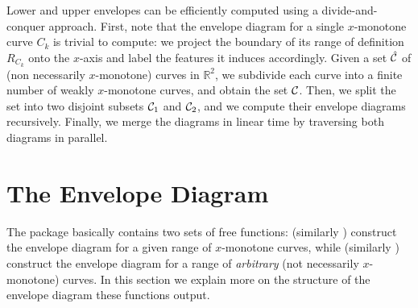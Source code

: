 Lower and upper envelopes can be efficiently computed using a
divide-and-conquer approach. First, note that the envelope diagram for
a single $x$-monotone curve $C_k$ is trivial to compute: we project
the boundary of its range of definition $R_{C_k}$ onto the $x$-axis
and label the features it induces accordingly. Given a set
$\hat{{\cal C}}$ of (non necessarily $x$-monotone) curves in ${\mathbb R}^2$,
we subdivide each curve into a finite number of weakly $x$-monotone 
curves, and obtain the set ${\cal C}$. Then, we split the set into two
disjoint subsets ${\cal C}_1$ and ${\cal C}_2$, and we compute their envelope
diagrams recursively. Finally, we merge the diagrams in linear time by
traversing both diagrams in parallel.

\section{The Envelope Diagram}
\label{env2_sec:env_diag}

The package basically contains two sets of free functions:
 (similarly
 ) construct the envelope diagram
for a given range of $x$-monotone curves, while 
 (similarly
) construct the envelope diagram for a
range of {\em arbitrary} (not necessarily $x$-monotone) curves.
In this section we explain more on the structure of the envelope
diagram these functions output.

